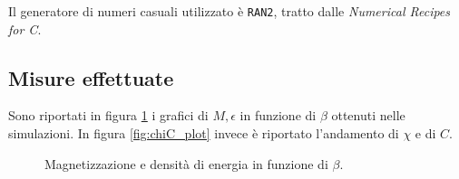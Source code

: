 \documentclass[a4paper,11pt]{article}
\newcommand{\code}[1]{\texttt{#1}}
\begin{document}
	Il generatore di numeri casuali utilizzato è \code{RAN2}, tratto dalle \emph{Numerical Recipes for C}.
	
	\subsection{Misure effettuate}
	
	Sono riportati in figura \ref{fig:em_plot} i grafici di $M, \epsilon$ in funzione di $\beta$ ottenuti nelle simulazioni. In figura \ref{fig:chiC_plot} invece è riportato l'andamento di $\chi$ e di $C$.
	
	\begin{figure}
        \caption{Magnetizzazione e densità di energia in funzione di $\beta$.}
        \label{fig:em_plot}
	\end{figure}
	
\end{document}
